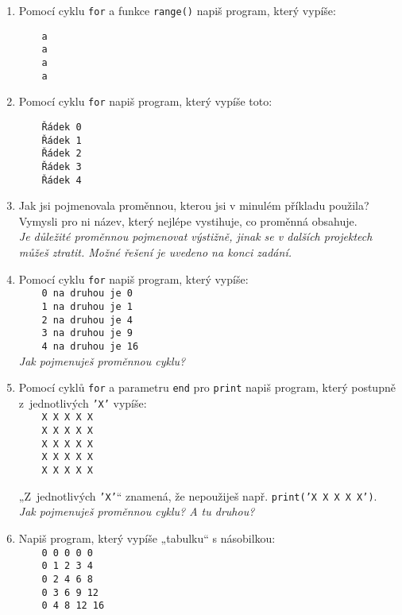 \documentclass[a4paper,10pt]{article}
\begin{document}
\begin{enumerate}[resume]
\item Pomocí cyklu \verb+for+ a funkce \texttt{range()} napiš program, který vypíše:
\begin{verbatim}
    a
    a
    a
    a
\end{verbatim}

\item Pomocí cyklu \verb+for+ napiš program, který vypíše toto:
\begin{verbatim}
    Řádek 0
    Řádek 1
    Řádek 2
    Řádek 3
    Řádek 4
\end{verbatim}

\item Jak jsi pojmenovala proměnnou, kterou jsi v minulém příkladu použila?
    Vymysli pro ni název, který nejlépe vystihuje, co proměnná obsahuje.
    \\\emph{\small Je důležité proměnnou pojmenovat výstižně, jinak se v dalších projektech můžeš ztratit.
            Možné řešení je uvedeno na konci zadání.}
    \label{cisloradku}

\item Pomocí cyklu \verb+for+ napiš program, který vypíše:
\\\verb+    0 na druhou je 0+
\\\verb+    1 na druhou je 1+
\\\verb+    2 na druhou je 4+
\\\verb+    3 na druhou je 9+
\\\verb+    4 na druhou je 16+
    \\\emph{\small Jak pojmenuješ proměnnou cyklu?}

\item Pomocí cyklů \verb+for+ a parametru \verb+end+ pro \verb+print+ napiš
    program, který postupně z~jednotlivých \texttt{'X'} vypíše:
\\\verb+    X X X X X+
\\\verb+    X X X X X+
\\\verb+    X X X X X+
\\\verb+    X X X X X+
\\\verb+    X X X X X+

„Z~jednotlivých \texttt{'X'}“ znamená, že nepoužiješ např. \texttt{print('X X X X X')}.
    \\\emph{\small Jak pojmenuješ proměnnou cyklu? A tu druhou?}

\item Napiš program, který vypíše „tabulku“ s násobilkou:
\\\verb+    0 0 0 0 0+
\\\verb+    0 1 2 3 4+
\\\verb+    0 2 4 6 8+
\\\verb+    0 3 6 9 12+
\\\verb+    0 4 8 12 16+


\end{enumerate}
\end{document}
